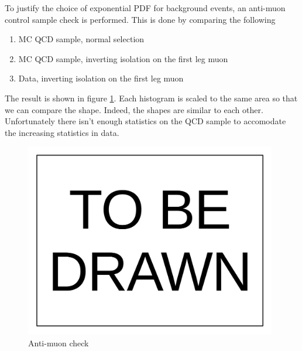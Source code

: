 \documentclass[10pt,a4paper,onecolumn]{article}
\begin{document}
To justify the choice of exponential PDF for background events, an anti-muon control sample check is performed.
This is done by comparing the following

\begin{enumerate}
\item MC QCD sample, normal selection
\item MC QCD sample, inverting isolation on the first leg muon
\item Data, inverting isolation on the first leg muon
\end{enumerate}

The result is shown in figure \ref{Figure_AntiMuonSingleLeg}.  Each histogram is scaled to the same area so that we can compare the shape.
Indeed, the shapes are similar to each other.  Unfortunately there isn't enough statistics on the QCD sample to accomodate the increasing statistics in data.

\begin{figure}
\includegraphics[width=110mm]{ToBeDrawn.pdf}
\caption{Anti-muon check}
\label{Figure_AntiMuonSingleLeg}
\end{figure}
\end{document}

